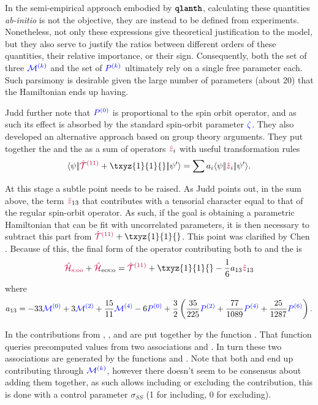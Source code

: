 \documentclass[11pt, twoside,openright]{article}
\begin{document}
In the semi-empirical approach embodied by $\textbf{\texttt{qlanth}}$, calculating these quantities \textit{ab-initio} is not the objective, they are instead to be defined from experiments. Nonetheless, not only these expressions give theoretical justification to the model, but they also serve to justify the ratios between different orders of these quantities, their relative importance, or their sign. Consequently, both the set of three $\textcolor{blue}{\mathcal{M}^{(k)}}$ and the set of $\textcolor{blue}{P^{(k)}}$ ultimately rely on a single free parameter each. Such parsimony is desirable given the large number of parameters (about 20) that the Hamiltonian ends up having.

    Judd \etal further note that $\textcolor{blue}{P^{(0)}}$ is proportional to the spin orbit operator, and as such its effect is absorbed by the standard spin-orbit parameter $\textcolor{blue}{{\zeta}}$. They also developed an alternative approach based on group theory arguments. They put together the \soo and the \ecso as a sum of operators $\textcolor{purple}{\hat{z}}_i$ with useful transformation rules 
    \begin{equation}
        \redbraopket{\psi}{\Txyz{1}{1}{} + \txyz{1}{1}{}}{\psi'} = \sum a_i \redbraopket{\psi}{\op{z}_i}{\psi'}.
    \end{equation}

    At this stage a subtle point needs to be raised. As Judd points out, in the sum above, the term $\textcolor{purple}{\hat{z}}_{13}$ that contributes with a tensorial character equal to that of the regular spin-orbit operator. As such, if the goal is obtaining a parametric Hamiltonian that can be fit with uncorrelated parameters, it is then necessary to subtract this part from $\Txyz{1}{1}{} + \txyz{1}{1}{}$. This point was clarified by Chen \etal \cite{chen_few_2008}. Because of this, the final form of the operator contributing both to \soo and the \ecso is
    \begin{equation}
        \hamSpinOtherOrbitSymbol + \hamECSOSymbol = \Txyz{1}{1}{} + \txyz{1}{1}{} - \frac{1}{6}a_{13}\op{z}_{13}
        \label{SOO ECSO sum}
    \end{equation}
    where
    \begin{equation}
        a_{13} = -33 \textcolor{blue}{\mathcal{M}^{(0)}} + 3 \textcolor{blue}{\mathcal{M}^{(2)}} + \frac{15}{11} \textcolor{blue}{\mathcal{M}^{(4)}} - 6 \textcolor{blue}{P^{(0)}} + \frac{3}{2} \left(\frac{35}{225} \textcolor{blue}{P^{(2)}} + \frac{77}{1089} \textcolor{blue}{P^{(4)}} + \frac{25}{1287} \textcolor{blue}{P^{(6)}}\right).
    \end{equation}

    In \qlanth the contributions from \spinspin, \soo, and \ecso are put together by the function . That function queries precomputed values from two associations  and . In turn these two associations are generated by the functions  and . Note that both \spinspin and \soo end up contributing through $\textcolor{blue}{\mathcal{M}^{(k)}}$, however there doesn't seem to be consensus about adding them together, as such \qlanth allows including or excluding the \spinspin contribution, this is done with a control parameter $\sigma_{SS}$ (1 for including, 0 for excluding).
\end{document}
